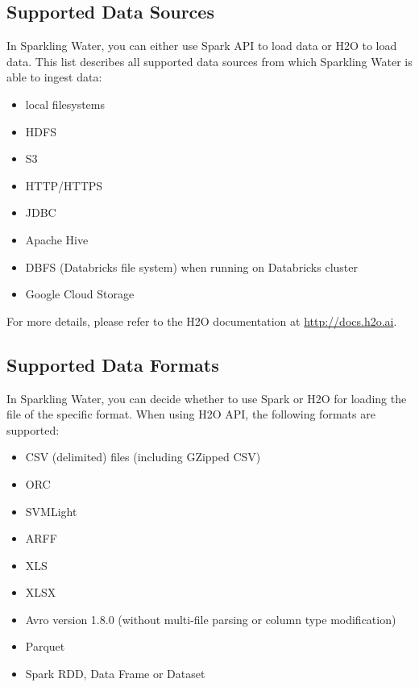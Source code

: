 \documentclass{standalone}
\begin{document}
    \subsection{Supported Data Sources}

    In Sparkling Water, you can either use Spark API to load data or H2O to load data. This list describes
    all supported data sources from which Sparkling Water is able to ingest data:

    \begin{itemize}
        \item local filesystems
        \item HDFS
        \item S3
        \item HTTP/HTTPS
        \item JDBC
        \item Apache Hive
        \item DBFS (Databricks file system) when running on Databricks cluster
        \item Google Cloud Storage
    \end{itemize}

    For more details, please refer to the H2O documentation at {\url{http://docs.h2o.ai}}.

    \subsection{Supported Data Formats}

    In Sparkling Water, you can decide whether to use Spark or H2O for loading the file of the specific format.
    When using H2O API, the following formats are supported:

    \begin{itemize}
        \item CSV (delimited) files (including GZipped CSV)
        \item ORC
        \item SVMLight
        \item ARFF
        \item XLS
        \item XLSX
        \item Avro version 1.8.0 (without multi-file parsing or column type modification)
        \item Parquet
        \item Spark RDD, Data Frame or Dataset
    \end{itemize}
\end{document}
